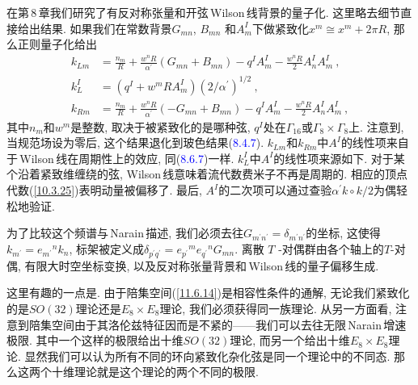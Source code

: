 在第\,8\,章我们研究了有反对称张量和开弦\,Wilson\,线背景的量子化. 这里略去细节直接给出结果. 如果我们在常数背景$ G_{mn}$, $B_{mn}$ 和$ A_{m}^{I} $下做紧致化$ x^{m}\cong x^{m}+2\pi R$, 那么正则量子化给出
\begin{subequations}
\begin{align}
    k_{Lm}&= \frac{n_{m}}{R}+\frac{w^{n}R}{\alpha^{\prime}}(G_{mn}+B_{mn})-q^{I}A_{m}^{I}-\frac{w^{n}R}{2}A_{n}^{I}A_{m}^{I}\:,\label{11.6.17a}\\
    k_{L}^{I} &= (q^{I}+w^{m}RA_{m}^{I})(2/\alpha^{\prime})^{1/2} \:, \label{11.6.17b} \\
    k_{Rm}&= \frac{n_{m}}{R}+\frac{w^{n}R}{\alpha^{\prime}}(-G_{mn}+B_{mn})-q^{I}A_{m}^{I}-\frac{w^{n}R}{2}A_{n}^{I}A_{m}^{I}\:,\label{11.6.17c}
\end{align}
\end{subequations}
其中$ n_{m} $和$ w^{m} $是整数, 取决于被紧致化的是哪种弦, $q^{I} $处在$ \Gamma_{16} $或$ \Gamma_{8}\times\Gamma_{8} $上. 注意到, 当规范场设为零后, 这个结果退化到玻色结果(\textcolor{blue}{8.4.7}). $k_{Lm} $和$ k_{Rm} $中$ A^{I} $的线性项来自于\,Wilson\,线在周期性上的效应, 同(\textcolor{blue}{8.6.7})一样. $k_{L}^{I} $中$ A^{I} $的线性项来源如下. 对于某个沿着紧致维缠绕的弦, Wilson\,线意味着流代数费米子不再是周期的. 相应的顶点代数(\ref{10.3.25})表明动量被偏移了. 最后, $A^{I} $的二次项可以通过查验$ \alpha^{\prime}k\circ k/2 $为偶轻松地验证.

为了比较这个频谱与\,Narain\,描述, 我们必须去往$ G_{m^{\prime}n^{\prime}}=\delta_{m^{\prime}n^{\prime}} $的坐标, 这使得$ k_{m^{\prime}}=e_{m^{\prime}}{}^{n}k_{n}$, 标架被定义成$ \delta_{p^{\prime}q^{\prime}}=e_{p^{\prime}}{}^{m}e_{q^{\prime}}{}^{n}G_{mn}$. 离散 $T$ -对偶群由各个轴上的$ T $-对偶, 有限大时空坐标变换, 以及反对称张量背景和\,Wilson\,线的量子偏移生成.

这里有趣的一点是. 由于陪集空间(\ref{11.6.14})是相容性条件的通解, 无论我们紧致化的是$ SO(32) $理论还是$ E_{8}\times E_{8} $理论, 我们必须获得同一族理论. 从另一方面看, 注意到陪集空间由于其洛伦兹特征因而是不紧的------我们可以去往无限\,Narain\,增速极限. 其中一个这样的极限给出十维$ SO(32) $理论, 而另一个给出十维$ E_{8}\times E_{8} $理论. 显然我们可以认为所有不同的环向紧致化杂化弦是同一个理论中的不同态. 那么这两个十维理论就是这个理论的两个不同的极限.


